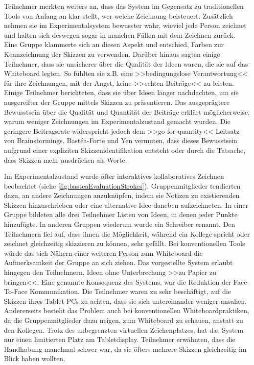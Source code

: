 \medskip Teilnehmer merkten weiters an, dass das System im Gegensatz zu traditionellen Tools von Anfang an klar stellt, wer welche Zeichnung beisteuert. Zusätzlich nehmen sie im Experimentalsystem bewusster wahr, wieviel jede Person zeichnet und halten sich deswegen sogar in manchen Fällen mit dem Zeichnen zurück. Eine Gruppe klammerte sich an diesen Aspekt und entschied, Farben zur Kennzeichnung der Skizzen zu verwenden. Darüber hinaus sagten einige Teilnehmer, dass sie unsicherer über die Qualität der Ideen waren, die sie auf das Whiteboard legten. So fühlten sie z.B. eine >>bedingungslose Verantwortung<< für ihre Zeichnungen, mit der Angst, keine >>echten Beiträge<< zu leisten. Einige Teilnehmer berichteten, dass sie über Ideen länger nachdachten, um sie ausgereifter der Gruppe mittels Skizzen zu präsentieren.
Das ausgeprägtere Bewusstsein über die Qualität und Quantität der Beiträge erklärt möglicherweise, warum weniger Zeichnungen im Experimentalzustand gemacht wurden. Die geringere Beitragsrate widerspricht jedoch dem >>go for quantity<< Leitsatz von Brainstormings. Bastéa-Forte und Yen vermuten, dass dieses Bewusstsein aufgrund einer expliziten Skizzenidentifikation entsteht oder durch die Tatsache, dass Skizzen mehr ausdrücken als Worte. 

\medskip Im Experimentalzustand wurde öfter interaktives kollaboratives Zeichnen beobachtet (siehe \autoref{fig:basteaEvaluationStrokes}). Gruppenmitglieder tendierten dazu, an andere Zeichnungen anzuknüpfen, indem sie Notizen zu existierenden Skizzen hinzuschrieben oder eine alternative Idee daneben aufzeichneten. In einer Gruppe bildeten alle drei Teilnehmer Listen von Ideen, in denen jeder Punkte hinzufügte. In anderen Gruppen wiederum wurde ein Schreiber ernannt.
Den Teilnehmern fiel auf, dass ihnen die Möglichkeit, während ein Kollege spricht oder zeichnet gleichzeitig skizzieren zu können, sehr gefällt. Bei konventionellen Tools würde das sich Nähern einer weiteren Person zum Whiteboard die Aufmerksamkeit der Gruppe an sich ziehen. Das vorgestellte System erlaubt hingegen den Teilnehmern, Ideen ohne Unterbrechung >>zu Papier zu bringen<<. 
Eine genannte Konsequenz des Systems, war die Reduktion der Face-To-Face Kommunikation. Die Teilnehmer waren zu sehr beschäftigt, auf die Skizzen ihres Tablet PCs zu achten, dass sie sich untereinander weniger ansahen. Andererseits besteht das Problem auch bei konventionellen Whiteboardpraktiken, da die Gruppenmitglieder dazu neigen, zum Whiteboard zu schauen, anstatt zu den Kollegen.
Trotz des unbegrenzten virtuellen Zeichenplatzes, hat das System nur einen limitierten Platz am Tabletdisplay. Teilnehmer erwähnten, dass die Handhabung manchmal schwer war, da sie öfters mehrere Skizzen gleichzeitig im Blick haben wollten.

